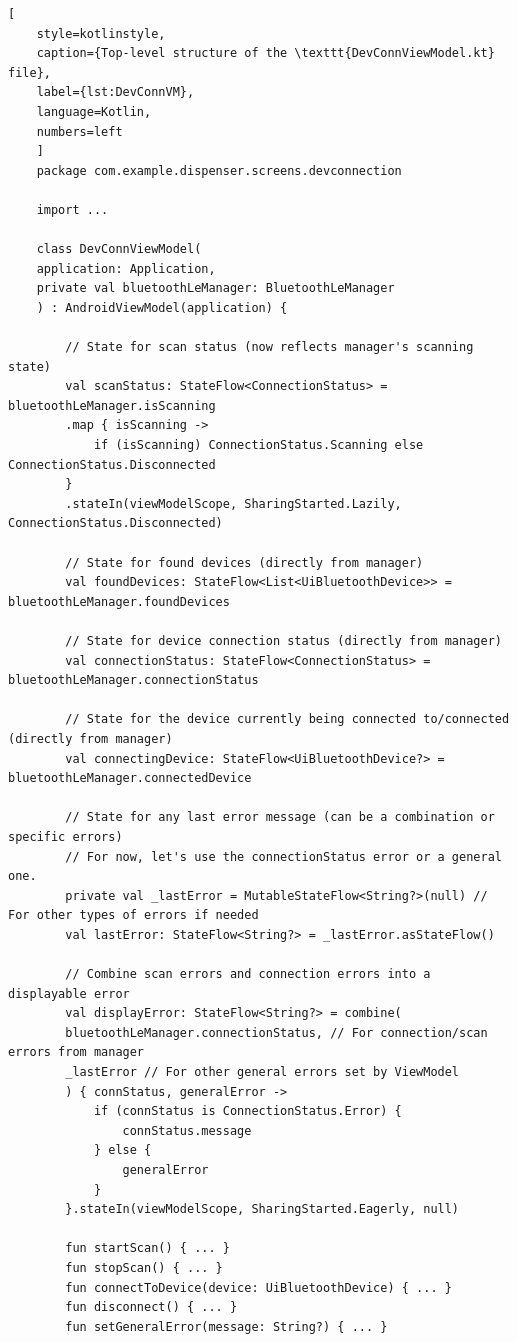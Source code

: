 \begin{lstlisting}[
	style=kotlinstyle,
	caption={Top-level structure of the \texttt{DevConnViewModel.kt} file},
	label={lst:DevConnVM},
	language=Kotlin,
	numbers=left
	]
	package com.example.dispenser.screens.devconnection
	
	import ...
	
	class DevConnViewModel(
	application: Application,
	private val bluetoothLeManager: BluetoothLeManager
	) : AndroidViewModel(application) {
		
		// State for scan status (now reflects manager's scanning state)
		val scanStatus: StateFlow<ConnectionStatus> = bluetoothLeManager.isScanning
		.map { isScanning ->
			if (isScanning) ConnectionStatus.Scanning else ConnectionStatus.Disconnected
		}
		.stateIn(viewModelScope, SharingStarted.Lazily, ConnectionStatus.Disconnected)
		
		// State for found devices (directly from manager)
		val foundDevices: StateFlow<List<UiBluetoothDevice>> = bluetoothLeManager.foundDevices
		
		// State for device connection status (directly from manager)
		val connectionStatus: StateFlow<ConnectionStatus> = bluetoothLeManager.connectionStatus
		
		// State for the device currently being connected to/connected (directly from manager)
		val connectingDevice: StateFlow<UiBluetoothDevice?> = bluetoothLeManager.connectedDevice
		
		// State for any last error message (can be a combination or specific errors)
		// For now, let's use the connectionStatus error or a general one.
		private val _lastError = MutableStateFlow<String?>(null) // For other types of errors if needed
		val lastError: StateFlow<String?> = _lastError.asStateFlow()
		
		// Combine scan errors and connection errors into a displayable error
		val displayError: StateFlow<String?> = combine(
		bluetoothLeManager.connectionStatus, // For connection/scan errors from manager
		_lastError // For other general errors set by ViewModel
		) { connStatus, generalError ->
			if (connStatus is ConnectionStatus.Error) {
				connStatus.message
			} else {
				generalError
			}
		}.stateIn(viewModelScope, SharingStarted.Eagerly, null)
		
		fun startScan() { ... }
		fun stopScan() { ... }
		fun connectToDevice(device: UiBluetoothDevice) { ... }
		fun disconnect() { ... }
		fun setGeneralError(message: String?) { ... }
		

\end{lstlisting}
